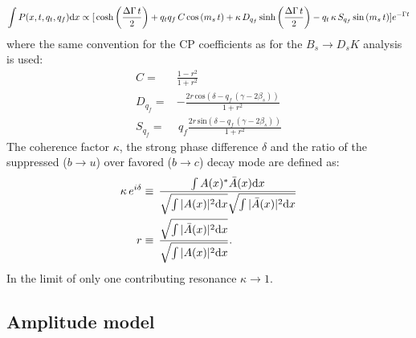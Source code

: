 \begin{equation}
\label{eq:PDF_intX}
	\int P(x,t,q_t,q_f) \text d x \propto    [
	\, \text{cosh} \left( \frac{\Delta \Gamma \, t}{2}\right) 
	  + q_t q_f \, C \, \text{cos} \left( m_s \, t \right)  
	  + \kappa \, D_{q_f} \, \text{sinh} \left( \frac{\Delta \Gamma \, t}{2}\right)  
	  - q_t \, \kappa \, S_{q_f}\, \text{sin} \left( m_s \, t \right)  ]  e^{- \Gamma t}
\end{equation}
where the same convention for the CP coefficients as for  the $B_s \to D_s K$ analysis is used:
\begin{align}
\label{eq:CPcoeff}
	C= & \frac{1-r^2}{1+r^2}   \\
	D_{q_f} = &  -\frac{2r \, \text{cos}(\delta-q_f \, (\gamma-2\beta_s))}{1+r^2}   \\
	S_{q_f} = & \, q_f \frac{2r \, \text{sin}(\delta-q_f \, (\gamma-2\beta_s))}{1+r^2}   
\end{align}
The coherence factor $\kappa$, the strong phase difference $\delta$ and the ratio of the suppressed ($b\to u$) over favored ($b\to c$) decay mode are defined as:
\begin{align}
\label{eq:coherenceFactor}
	\kappa \, e^{i\delta} &\equiv \, \frac{\int A(x)^{*}  \bar A(x)  \text d x}{\sqrt{\int \vert A(x) \vert^2\text d x} \sqrt{\int \vert \bar A(x) \vert^2\text d x}  } \\
	r &\equiv \, \frac{\sqrt{\int \vert \bar A(x) \vert^2\text d x }}{\sqrt{\int \vert A(x) \vert^2\text d x}} .
\end{align}
In the limit of only one contributing resonance $\kappa \to 1$. \\

\subsection{Amplitude model}

